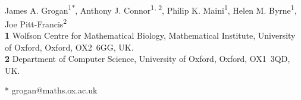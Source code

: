 \documentclass[10pt,letterpaper]{article}
\date{}
\begin{document}
\vspace*{0.2in}

\begin{flushleft}
{\Large
\textbf{} %
}
\newline
\\
James A. Grogan\textsuperscript{1*},
Anthony J. Connor\textsuperscript{1, 2},
Philip K. Maini\textsuperscript{1},
Helen M. Byrne\textsuperscript{1},
Joe Pitt-Francis\textsuperscript{2}
\\
\bigskip
\textbf{1} Wolfson Centre for Mathematical Biology, Mathematical Institute, University of Oxford, Oxford, \mbox{OX2 6GG}, UK.
\\
\textbf{2} Department of Computer Science, University of Oxford, Oxford, \mbox{OX1 3QD}, UK.
\\
\bigskip

% 
%





* grogan@maths.ox.ac.uk

\end{flushleft}
\end{document}
